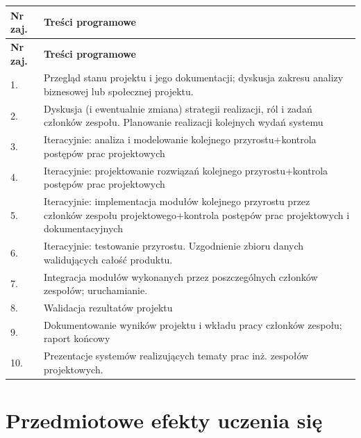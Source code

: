 \documentclass[12pt, a4paper]{article}
\newcommand{\thdrule}{\noalign{\global\setlength{\extrarowheight}{0pt}}}
\newcommand{\thdend}{\noalign{\global\setlength{\extrarowheight}{3pt}}}
\begin{document}
{\scriptsize
\begin{longtable}{m{1.5cm}m{14.5cm}}
\thdrule\toprule
\rowcolor{pjatkRed} {\color{white}\textbf{Nr zaj.}} & {\color{white}\textbf{Treści programowe}} \\
\midrule\thdend
\endfirsthead
\thdrule\toprule
\rowcolor{pjatkRed} {\color{white}\textbf{Nr zaj.}} & {\color{white}\textbf{Treści programowe}} \\
\midrule\thdend
\endhead
  \rowcolor{tableRowLight} 1. & Przegląd stanu projektu i jego dokumentacji; dyskusja zakresu analizy biznesowej lub społecznej projektu. \\
  \rowcolor{tableRowAlt} 2. & Dyskusja (i ewentualnie zmiana) strategii realizacji, ról i zadań członków zespołu. Planowanie realizacji kolejnych wydań systemu \\
  \rowcolor{tableRowLight} 3. & Iteracyjnie: analiza i modelowanie kolejnego przyrostu+kontrola postępów prac projektowych \\
  \rowcolor{tableRowAlt} 4. & Iteracyjnie: projektowanie rozwiązań kolejnego przyrostu+kontrola postępów prac projektowych \\
  \rowcolor{tableRowLight} 5. & Iteracyjnie: implementacja modułów kolejnego przyrostu przez członków zespołu projektowego+kontrola postępów prac projektowych i dokumentacyjnych \\
  \rowcolor{tableRowAlt} 6. & Iteracyjnie: testowanie przyrostu. Uzgodnienie zbioru danych walidujących całość produktu. \\
  \rowcolor{tableRowLight} 7. & Integracja modułów wykonanych przez poszczególnych członków zespołów; uruchamianie. \\
  \rowcolor{tableRowAlt} 8. & Walidacja rezultatów projektu \\
  \rowcolor{tableRowLight} 9. & Dokumentowanie wyników projektu i wkładu pracy członków zespołu; raport końcowy \\
  \rowcolor{tableRowAlt} 10. & Prezentacje systemów realizujących tematy prac inż. zespołów projektowych. \\
\bottomrule
\end{longtable}}

\section{Przedmiotowe efekty uczenia się}
\end{document}
